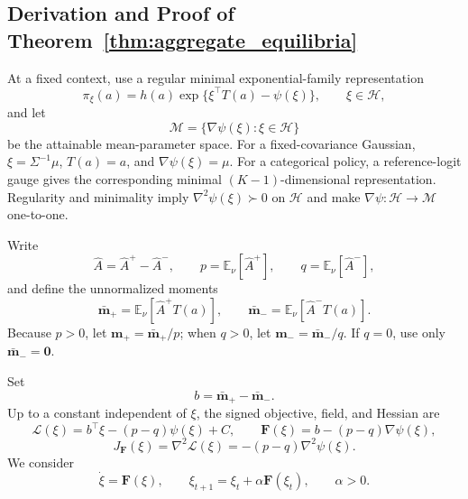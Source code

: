 \documentclass{article}
\theoremstyle{plain}
\theoremstyle{definition}
\theoremstyle{remark}
\begin{document}
\subsection{Derivation and Proof of
Theorem~\ref{thm:aggregate_equilibria}}
\label{app:aggregate_equilibrium}

At a fixed context, use a regular minimal exponential-family
representation
\[
\pi_\xi(a)
=
h(a)\exp\{\xi^\top T(a)-\psi(\xi)\},
\qquad
\xi\in\mathcal H,
\]
and let
\[
\mathcal M
=
\{\nabla\psi(\xi):\xi\in\mathcal H\}
\]
be the attainable mean-parameter space. For a fixed-covariance Gaussian,
\(\xi=\Sigma^{-1}\mu\), \(T(a)=a\), and
\(\nabla\psi(\xi)=\mu\). For a categorical policy, a reference-logit
gauge gives the corresponding minimal \((K-1)\)-dimensional
representation. Regularity and minimality imply
\(\nabla^2\psi(\xi)\succ0\) on \(\mathcal H\) and make
\(\nabla\psi:\mathcal H\to\mathcal M\) one-to-one.

Write
\[
\widehat A=\widehat A^+-\widehat A^-,
\qquad
p=\mathbb E_\nu[\widehat A^+],
\qquad
q=\mathbb E_\nu[\widehat A^-],
\]
and define the unnormalized moments
\[
\bar{\mathbf m}_+
=
\mathbb E_\nu[\widehat A^+T(a)],
\qquad
\bar{\mathbf m}_-
=
\mathbb E_\nu[\widehat A^-T(a)].
\]
Because \(p>0\), let
\(\mathbf m_+=\bar{\mathbf m}_+/p\); when \(q>0\), let
\(\mathbf m_-=\bar{\mathbf m}_-/q\). If \(q=0\), use only
\(\bar{\mathbf m}_-=\mathbf0\).

Set
\[
b
=
\bar{\mathbf m}_+-\bar{\mathbf m}_-.
\]
Up to a constant independent of \(\xi\), the signed objective, field,
and Hessian are
\[
\mathcal L(\xi)
=
b^\top\xi-(p-q)\psi(\xi)+C,
\qquad
\mathbf F(\xi)
=
b-(p-q)\nabla\psi(\xi),
\]
\[
J_{\mathbf F}(\xi)
=
\nabla^2\mathcal L(\xi)
=
-(p-q)\nabla^2\psi(\xi).
\]
We consider
\[
\dot\xi=\mathbf F(\xi),
\qquad
\xi_{t+1}=\xi_t+\alpha\mathbf F(\xi_t),
\qquad
\alpha>0.
\]
\end{document}
